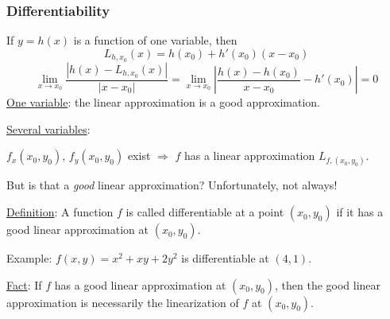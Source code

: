 \begin{frame}
  \frametitle{Differentiability}

If $y=h(x)$ is a function of one variable, then
%
$$L_{h,x_0}(x) = h(x_0) + h'(x_0) (x-x_0)$$
%
$$
  \lim_{x\to x_0} \frac{|h(x)-L_{h,x_0}(x)|}{|x-x_0|} = \lim_{x \to x_0} \left| \frac{h(x)-h(x_0)}{x-x_0} -h'(x_0) \right| = 0
$$
%
\pause \underline{One variable}: the linear approximation is a good approximation.

\pause \underline{Several variables}:

$f_x(x_0,y_0)$, $f_y(x_0,y_0)$ exist $\Longrightarrow$
$f$ has a linear approximation $L_{f, (x_0,y_0)}$.

But is that a \emph{good} linear approximation? \pause
Unfortunately, \textcolor[rgb]{0.98,0.00,0.00}{not always}!

\medskip

\pause \underline{Definition}: A function $f$ is called \textcolor[rgb]{0.98,0.00,0.00}{differentiable at a point} $(x_0,y_0)$ if it has a good linear approximation at $(x_0,y_0)$.

\medskip

\pause Example: $f(x,y) = x^2+xy+2y^2$ is differentiable at $(4,1)$.

\medskip

\pause \underline{Fact}: If $f$ has a good linear approximation at $(x_0,y_0)$, then the good linear approximation is necessarily the linearization of $f$ at $(x_0,y_0)$.
\end{frame}